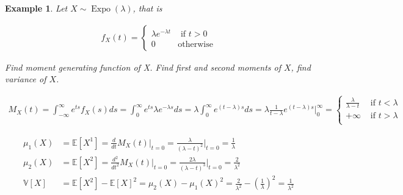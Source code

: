 \documentclass[10pt]{article}
\newtheorem*{example}{Example}
\begin{document}
\begin{example} Let $X\sim \operatorname{Expo}(\lambda)$, that is

    \begin{align}
        f_X(t)=
        \begin{cases}
            \lambda e^{-\lambda t} & \mbox{ if } t>0  \\
            0                      & \mbox{otherwise}
        \end{cases}
    \end{align}

    Find moment generating function of X. Find first and second moments of $X$,
    find variance of $X$.

    \begin{align}
        M_X(t)
        =\int_{-\infty}^\infty e^{ts} f_X(s)ds
        =\int_{0}^\infty e^{ts} \lambda e^{-\lambda s}ds
        =\lambda\int_{0}^\infty e^{(t-\lambda) s}ds
        =\lambda\frac{1}{t-\lambda} e^{(t-\lambda) s}\Biggl|_{0}^\infty
        =\begin{cases}
            \frac{\lambda}{\lambda-t} & \mbox{ if } t<\lambda \\
            +\infty                   & \mbox{ if } t>\lambda \\
        \end{cases}
    \end{align}

    \begin{align}
        \mu_1(X)
         & =\mathbb{E}[X^1]
        =\frac{d}{dt}M_X(t)\Biggl|_{t=0}
        =\frac{\lambda}{{(\lambda-t)}^2}\Biggl|_{t=0}
        =\frac{1}{\lambda}                    \\
        \mu_2(X)
         & =\mathbb{E}[X^2]
        =\frac{d^2}{dt^2}M_X(t)\Biggl|_{t=0}
        =\frac{2\lambda}{{(\lambda-t)}^3}\Biggl|_{t=0}
        =\frac{2}{\lambda^2}                  \\
        \mathbb{V}[X]
         & =\mathbb{E}[X^2]-{\mathbb{E}[X]}^2
        =\mu_2(X)-{\mu_1(X)}^2
        =\frac{2}{\lambda^2}-{\left(\frac{1}{\lambda}\right)}^2
        =\frac{1}{\lambda^2}
    \end{align}
\end{example}
\end{document}
